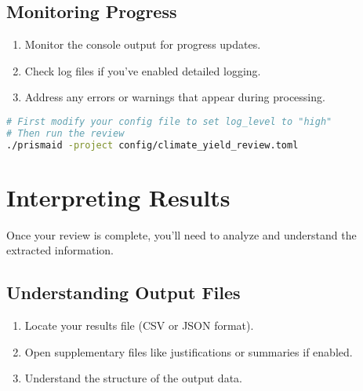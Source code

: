 \subsection{Monitoring Progress}

\begin{enumerate}
    \item Monitor the console output for progress updates.
    \item Check log files if you've enabled detailed logging.
    \item Address any errors or warnings that appear during processing.
\end{enumerate}

\begin{commandbox}
\begin{lstlisting}[language=Bash]
# First modify your config file to set log_level to "high"
# Then run the review
./prismaid -project config/climate_yield_review.toml
\end{lstlisting}
\end{commandbox}

\section{Interpreting Results}

Once your review is complete, you'll need to analyze and understand the extracted information.

\subsection{Understanding Output Files}

\begin{enumerate}
    \item Locate your results file (CSV or JSON format).
    \item Open supplementary files like justifications or summaries if enabled.
    \item Understand the structure of the output data.
\end{enumerate}

